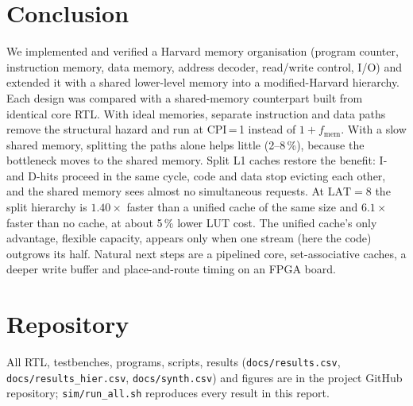 \documentclass[conference]{IEEEtran}
\begin{document}
\section{Conclusion}
We implemented and verified a Harvard memory organisation (program counter,
instruction memory, data memory, address decoder, read/write control, I/O) and
extended it with a shared lower-level memory into a modified-Harvard
hierarchy. Each design was compared with a shared-memory counterpart built from
identical core RTL. With ideal memories, separate instruction and data paths
remove the structural hazard and run at CPI\,=\,1 instead of
$1+f_{\text{mem}}$. With a slow shared memory, splitting the paths alone helps
little (2--8\,\%), because the bottleneck moves to the shared memory. Split L1
caches restore the benefit: I- and D-hits proceed in the same cycle, code and
data stop evicting each other, and the shared memory sees almost no
simultaneous requests. At $\text{LAT}=8$ the split hierarchy is $1.40\times$
faster than a unified cache of the same size and $6.1\times$ faster than no
cache, at about 5\,\% lower LUT cost. The unified cache's only advantage,
flexible capacity, appears only when one stream (here the code) outgrows its
half. Natural next steps are a pipelined core, set-associative caches, a deeper
write buffer and place-and-route timing on an FPGA board.

\section*{Repository}
All RTL, testbenches, programs, scripts, results (\texttt{docs/results.csv},
\texttt{docs/results\_hier.csv}, \texttt{docs/synth.csv}) and figures are in
the project GitHub repository; \texttt{sim/run\_all.sh} reproduces every
result in this report.
\end{document}
